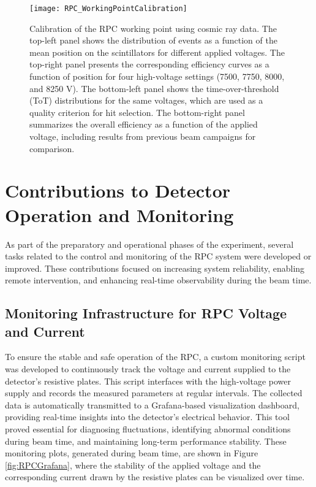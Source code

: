 {{{\begin{figure}
	\centering
	\texttt{[image: RPC\_WorkingPointCalibration]}
	\caption[Calibration of the RPC working point with cosmic rays]{Calibration of the \gls{RPC} working point using cosmic ray data. The top-left panel shows the distribution of events as a function of the mean position on the scintillators for different applied voltages. The top-right panel presents the corresponding efficiency curves as a function of position for four high-voltage settings (7500, 7750, 8000, and 8250 V). The bottom-left panel shows the time-over-threshold (ToT) distributions for the same voltages, which are used as a quality criterion for hit selection. The bottom-right panel summarizes the overall efficiency as a function of the applied voltage, including results from previous beam campaigns for comparison.}
	\label{fig:RPC_WorkingPointCalibration}
\end{figure}

\section{Contributions to Detector Operation and Monitoring}

As part of the preparatory and operational phases of the experiment, several tasks related to the control and monitoring of the \gls{RPC} system were developed or improved. These contributions focused on increasing system reliability, enabling remote intervention, and enhancing real-time observability during the beam time.

\subsection{Monitoring Infrastructure for RPC Voltage and Current}

To ensure the stable and safe operation of the \gls{RPC}, a custom monitoring script was developed to continuously track the voltage and current supplied to the detector’s resistive plates. This script interfaces with the high-voltage power supply and records the measured parameters at regular intervals. The collected data is automatically transmitted to a Grafana-based visualization dashboard, providing real-time insights into the detector’s electrical behavior. This tool proved essential for diagnosing fluctuations, identifying abnormal conditions during beam time, and maintaining long-term performance stability.
These monitoring plots, generated during beam time, are shown in Figure \ref{fig:RPCGrafana}, where the stability of the applied voltage and the corresponding current drawn by the resistive plates can be visualized over time.

}}}
